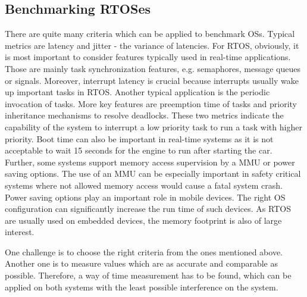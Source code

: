 \subsection{Benchmarking RTOSes}
There are quite many criteria which can be applied to benchmark \acp{OS}.
Typical metrics are latency and jitter - the variance of latencies.
For \ac{RTOS}, obviously, it is most important to consider features typically used in real-time applications.
Those are mainly task synchronization features, e.g. semaphores, message queues or signals.
Moreover, interrupt latency is crucial because interrupts usually wake up important tasks in \ac{RTOS}.
Another typical application is the periodic invocation of tasks. 
More key features are preemption time of tasks and priority inheritance mechanisms to resolve deadlocks.
These two metrics indicate the capability of the system to interrupt a low priority task to run a task with higher priority. 
Boot time can also be important in real-time systems as it is not acceptable to wait 15 seconds for the engine to run after starting the car.
Further, some systems support memory access supervision by a \ac{MMU} or power saving options.
The use of an \ac{MMU} can be especially important in safety critical systems where not allowed memory access would cause a fatal system crash.
Power saving options play an important role in mobile devices.
The right \ac{OS} configuration can significantly increase the run time of such devices.
As \ac{RTOS} are usually used on embedded devices, the memory footprint is also of large interest. 
\par
One challenge is to choose the right criteria from the ones mentioned above. 
Another one is to measure values which are as accurate and comparable as possible.
Therefore, a way of time measurement has to be found, which can be applied on both systems with the least possible interference on the system.

